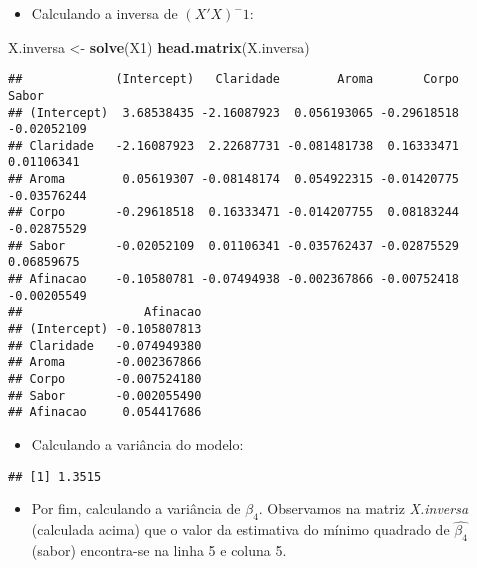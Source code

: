 \documentclass[
]{article}
\newenvironment{Shaded}{\begin{snugshade}}{\end{snugshade}}
\newcommand{\DecValTok}[1]{\textcolor[rgb]{0.00,0.00,0.81}{#1}}
\newcommand{\KeywordTok}[1]{\textcolor[rgb]{0.13,0.29,0.53}{\textbf{#1}}}
\newcommand{\NormalTok}[1]{#1}
\newcommand{\OperatorTok}[1]{\textcolor[rgb]{0.81,0.36,0.00}{\textbf{#1}}}
\newcommand{\StringTok}[1]{\textcolor[rgb]{0.31,0.60,0.02}{#1}}
\providecommand{\tightlist}{%
  \setlength{\itemsep}{0pt}\setlength{\parskip}{0pt}}
\begin{document}
\begin{itemize}
\tightlist
\item
  Calculando a inversa de \((X'X)^-1\):
\end{itemize}

\begin{Shaded}
\begin{Highlighting}[]
\NormalTok{X.inversa <-}\StringTok{ }\KeywordTok{solve}\NormalTok{(X1)}
\KeywordTok{head.matrix}\NormalTok{(X.inversa)}
\end{Highlighting}
\end{Shaded}

\begin{verbatim}
##             (Intercept)   Claridade        Aroma       Corpo       Sabor
## (Intercept)  3.68538435 -2.16087923  0.056193065 -0.29618518 -0.02052109
## Claridade   -2.16087923  2.22687731 -0.081481738  0.16333471  0.01106341
## Aroma        0.05619307 -0.08148174  0.054922315 -0.01420775 -0.03576244
## Corpo       -0.29618518  0.16333471 -0.014207755  0.08183244 -0.02875529
## Sabor       -0.02052109  0.01106341 -0.035762437 -0.02875529  0.06859675
## Afinacao    -0.10580781 -0.07494938 -0.002367866 -0.00752418 -0.00205549
##                 Afinacao
## (Intercept) -0.105807813
## Claridade   -0.074949380
## Aroma       -0.002367866
## Corpo       -0.007524180
## Sabor       -0.002055490
## Afinacao     0.054417686
\end{verbatim}

\begin{itemize}
\tightlist
\item
  Calculando a variância do modelo:
\end{itemize}

\begin{Shaded}
\end{Shaded}

\begin{verbatim}
## [1] 1.3515
\end{verbatim}

\begin{itemize}
\tightlist
\item
  Por fim, calculando a variância de \(\widehat{\beta_4}\). Observamos
  na matriz \emph{X.inversa} (calculada acima) que o valor da estimativa
  do mínimo quadrado de \(\widehat{\beta_4}\) (sabor) encontra-se na
  linha 5 e coluna 5.
\end{itemize}
\end{document}
